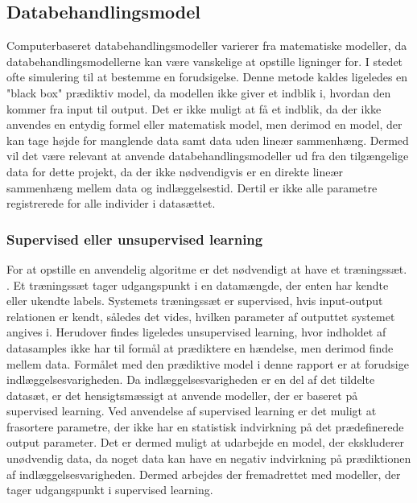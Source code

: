 \subsection{Databehandlingsmodel}
Computerbaseret databehandlingsmodeller varierer fra matematiske modeller, da databehandlingsmodellerne kan være vanskelige at opstille ligninger for. I stedet ofte simulering til at bestemme en forudsigelse. Denne metode kaldes ligeledes en "black box" prædiktiv model, da modellen ikke giver et indblik i, hvordan den kommer fra input til output. Det er ikke muligt at få et indblik, da der ikke anvendes en entydig formel eller matematisk model, men derimod en model, der kan tage højde for manglende data samt data uden lineær sammenhæng. Dermed vil det være relevant at anvende databehandlingsmodeller ud fra den tilgængelige data for dette projekt, da der ikke nødvendigvis er en direkte lineær sammenhæng mellem data og indlæggelsestid. Dertil er ikke alle parametre registrerede for alle individer i datasættet. \cite{Kuhn2013}


\subsubsection{Supervised eller unsupervised learning}
For at opstille en anvendelig algoritme er det nødvendigt at have et træningssæt. 
\cite{DIKU2010}. Et træningssæt tager udgangspunkt i en datamængde, der enten har kendte eller ukendte labels. Systemets træningssæt er supervised, hvis input-output relationen er kendt, således det vides, hvilken parameter af outputtet systemet angives i. \cite{Brownlee2013} Herudover findes ligeledes unsupervised learning, hvor indholdet af datasamples ikke har til formål at prædiktere en hændelse, men derimod finde mellem data.\cite{Brownlee2013, Kuhn2013} Formålet med den prædiktive model i denne rapport er at forudsige indlæggelsesvarigheden. Da indlæggelsesvarigheden er en del af det tildelte datasæt, er det hensigtsmæssigt at anvende modeller, der er baseret på supervised learning. Ved anvendelse af supervised learning er det muligt at frasortere parametre, der ikke har en statistisk indvirkning på det prædefinerede output parameter. Det er dermed muligt at udarbejde en model, der ekskluderer unødvendig data, da noget data kan have en negativ indvirkning på prædiktionen af indlæggelsesvarigheden. Dermed arbejdes der fremadrettet med modeller, der tager udgangspunkt i supervised learning.

